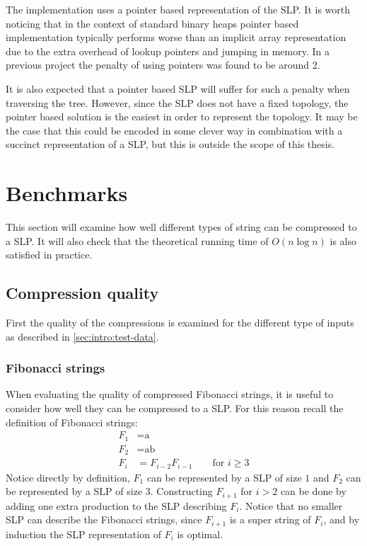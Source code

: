 \documentclass[twoside,11pt,openright]{report}
\begin{document}
The implementation uses a pointer based representation of the SLP. It is worth noticing that in the context of standard binary heaps pointer based implementation typically performs worse than an implicit array representation due to the extra overhead of lookup pointers and jumping in memory. In a previous project \cite[p. 9]{AA13Project1} the penalty of using pointers was found to be around $2$.

It is also expected that a pointer based SLP will suffer for such a penalty when traversing the tree. However, since the SLP does not have a fixed topology, the pointer based solution is the easiest in order to represent the topology. It may be the case that this could be encoded in some clever way in combination with a succinct representation of a SLP, but this is outside the scope of this thesis.

\section{Benchmarks}
\label{sec:compression:benchmarks}
This section will examine how well different types of string can be compressed to a SLP. It will also check that the theoretical running time of $O(n\log{n})$ is also satisfied in practice.

\subsection{Compression quality}
First the quality of the compressions is examined for the different type of inputs as described in \cref{sec:intro:test-data}.

\subsubsection{Fibonacci strings}
When evaluating the quality of compressed Fibonacci strings, it is useful to consider how well they can be compressed to a SLP. For this reason recall the definition of Fibonacci strings:
\begin{align*}
  F_1 &= \text{a} \\
  F_2 &= \text{ab} \\
  F_{i} &= F_{i - 2} F_{i - 1} \quad\quad \text{for } i \geq 3
\end{align*}
Notice directly by definition, $F_1$ can be represented by a SLP of size $1$ and $F_2$ can be represented by a SLP of size $3$. Constructing $F_{i + 1}$ for $i > 2$ can be done by adding one extra production to the SLP describing $F_{i}$. Notice that no smaller SLP can describe the Fibonacci strings, since $F_{i+1}$ is a super string of $F_i$, and by induction the SLP representation of $F_i$ is optimal.
\end{document}

